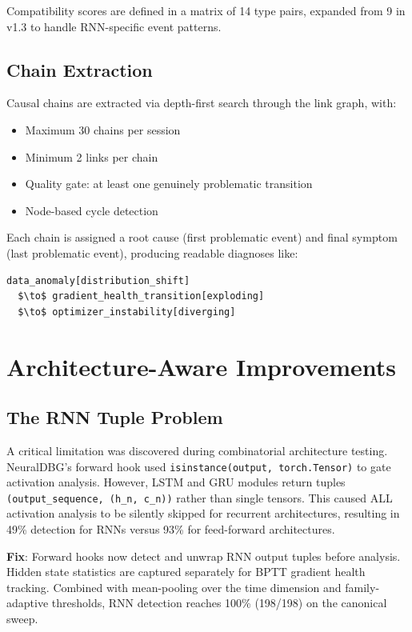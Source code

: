 \documentclass[11pt]{article}
\begin{document}
Compatibility scores are defined in a matrix of 14 type pairs, expanded from 9 in v1.3 to handle RNN-specific event patterns.

\subsection{Chain Extraction}

Causal chains are extracted via depth-first search through the link graph, with:
\begin{itemize}
    \item Maximum 30 chains per session
    \item Minimum 2 links per chain
    \item Quality gate: at least one genuinely problematic transition
    \item Node-based cycle detection
\end{itemize}

Each chain is assigned a root cause (first problematic event) and final symptom (last problematic event), producing readable diagnoses like:

\begin{verbatim}
data_anomaly[distribution_shift]
  $\to$ gradient_health_transition[exploding]
  $\to$ optimizer_instability[diverging]
\end{verbatim}

\section{Architecture-Aware Improvements}

\subsection{The RNN Tuple Problem}

A critical limitation was discovered during combinatorial architecture testing. NeuralDBG's forward hook used \texttt{isinstance(output, torch.Tensor)} to gate activation analysis. However, LSTM and GRU modules return tuples \texttt{(output\_sequence, (h\_n, c\_n))} rather than single tensors. This caused ALL activation analysis to be silently skipped for recurrent architectures, resulting in 49\% detection for RNNs versus 93\% for feed-forward architectures.

\textbf{Fix}: Forward hooks now detect and unwrap RNN output tuples before analysis. Hidden state statistics are captured separately for BPTT gradient health tracking. Combined with mean-pooling over the time dimension and family-adaptive thresholds, RNN detection reaches 100\% (198/198) on the canonical sweep.
\end{document}

